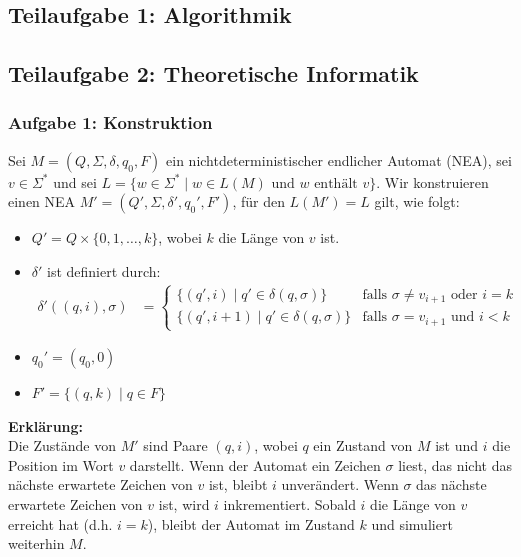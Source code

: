 \subsection{Teilaufgabe 1: Algorithmik}

\subsection{Teilaufgabe 2: Theoretische Informatik}

\subsubsection{Aufgabe 1: Konstruktion}

\begin{teile}
	\item
	Sei $M = (Q, \Sigma, \delta, q_0, F)$ ein nichtdeterministischer endlicher Automat (NEA), sei $v \in \Sigma^*$ und sei $L = \{ w \in \Sigma^* \mid w \in L(M) \text{ und } w \text{ enthält } v \}$. Wir konstruieren einen NEA $M' = (Q', \Sigma, \delta', q_0', F')$, für den $L(M') = L$ gilt, wie folgt:

	\begin{itemize}
		\item $Q' = Q \times \{0, 1, \ldots, k\}$, wobei $k$ die Länge von $v$ ist.
		\item $\delta'$ ist definiert durch:
		\begin{align*}
			\delta'((q, i), \sigma) &= \begin{cases}
				\{ (q', i) \mid q' \in \delta(q, \sigma) \} & \text{falls } \sigma \neq v_{i+1}\text{ oder } i = k \\
				\{ (q', i+1) \mid q' \in \delta(q, \sigma) \} & \text{falls } \sigma = v_{i+1} \text{ und } i < k
			\end{cases}
		\end{align*}
		\item $q_0' = (q_0, 0)$
		\item $F' = \{ (q, k) \mid q \in F \}$
	\end{itemize}

	\textbf{Erklärung:}\\
	Die Zustände von $M'$ sind Paare $(q, i)$, wobei $q$ ein Zustand von $M$ ist und $i$ die Position im Wort $v$ darstellt. Wenn der Automat ein Zeichen $\sigma$ liest, das nicht das nächste erwartete Zeichen von $v$ ist, bleibt $i$ unverändert. Wenn $\sigma$ das nächste erwartete Zeichen von $v$ ist, wird $i$ inkrementiert. Sobald $i$ die Länge von $v$ erreicht hat (d.h. $i = k$), bleibt der Automat im Zustand $k$ und simuliert weiterhin $M$.


\end{teile}
